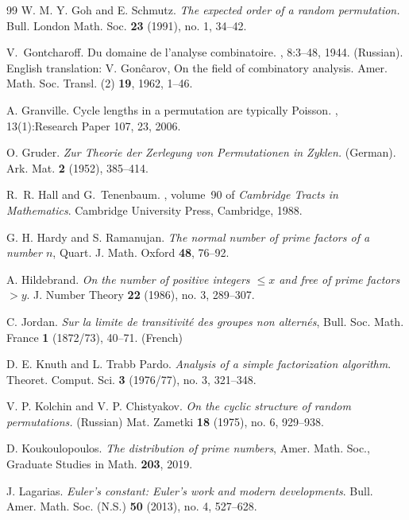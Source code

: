 \documentclass[10pt]{article}
\renewcommand{\le}{\leqslant}
\renewcommand{\(}{\left(}
\renewcommand{\)}{\right)}
\begin{document}
\begin{thebibliography}{99}
{\sc W. M. Y. Goh and E. Schmutz}.
\emph{The expected order of a random permutation.}
Bull. London Math. Soc. {\bf 23} (1991), no. 1, 34--42. 


{\sc V.~Gontcharoff}.
\newblock Du domaine de l'analyse combinatoire.
,
  8:3--48, 1944. (Russian).
  English translation: V. Gon{\^ c}arov,
  On the field of combinatory analysis.
Amer. Math. Soc. Transl. (2) {\bf 19}, 1962, 1--46. 

{\sc A. Granville}.
\newblock Cycle lengths in a permutation are typically {P}oisson.
, 13(1):Research Paper 107, 23, 2006.

{\sc O. Gruder}.
\emph{Zur Theorie der Zerlegung von Permutationen in Zyklen.} (German).
Ark. Mat. {\bf 2} (1952), 385--414. 

{\sc R.~R. Hall and G.~Tenenbaum}.
, volume~90 of {\em Cambridge Tracts in Mathematics}.
\newblock Cambridge University Press, Cambridge, 1988.

 {\sc G. H. Hardy and S. Ramanujan}.
\emph{The normal number of prime factors of a number $n$},
Quart. J. Math. Oxford {\bf 48}, 76--92.

{\sc A. Hildebrand}.
\emph{On the number of positive integers $\le x$ and free of prime factors $>y$}.
J. Number Theory {\bf 22} (1986), no. 3, 289--307.

{\sc C. Jordan}.
\emph{Sur la limite de transitivit{\' e} des groupes non altern{\' e}s}, Bull. Soc. Math. France {\bf 1} (1872/73), 40--71. (French)


{\sc D. E. Knuth and L. Trabb Pardo}.
\emph{Analysis of a simple factorization algorithm}.
Theoret. Comput. Sci. {\bf 3} (1976/77), no. 3, 321--348. 


{\sc V. P. Kolchin and V. P. Chistyakov}.
\emph{On the cyclic structure of random permutations.} (Russian)
Mat. Zametki {\bf 18} (1975), no. 6, 929--938. 


{\sc D. Koukoulopoulos}. \emph{The distribution of prime numbers},
Amer. Math. Soc., Graduate Studies in Math. {\bf 203}, 2019.

{\sc J. Lagarias}.
\emph{Euler's constant: Euler's work and modern developments}.
Bull. Amer. Math. Soc. (N.S.) {\bf 50} (2013), no. 4, 527--628. 


\end{thebibliography}
\end{document}
